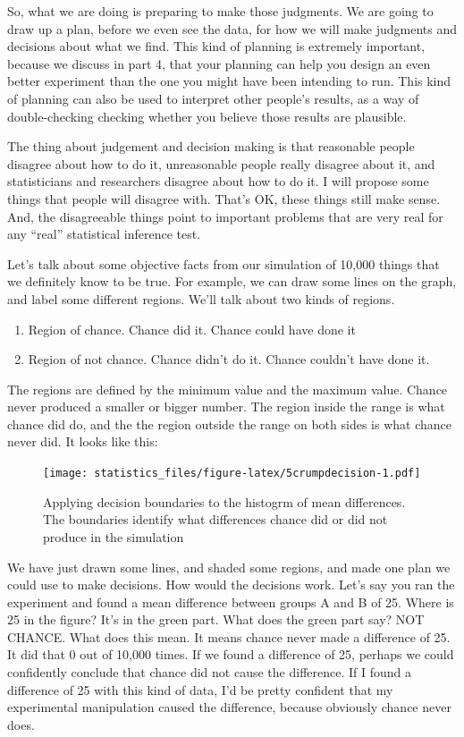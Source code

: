 \documentclass[]{book}
\providecommand{\tightlist}{%
  \setlength{\itemsep}{0pt}\setlength{\parskip}{0pt}}
\begin{document}
So, what we are doing is preparing to make those judgments. We are going to draw up a plan, before we even see the data, for how we will make judgments and decisions about what we find. This kind of planning is extremely important, because we discuss in part 4, that your planning can help you design an even better experiment than the one you might have been intending to run. This kind of planning can also be used to interpret other people's results, as a way of double-checking checking whether you believe those results are plausible.

The thing about judgement and decision making is that reasonable people disagree about how to do it, unreasonable people really disagree about it, and statisticians and researchers disagree about how to do it. I will propose some things that people will disagree with. That's OK, these things still make sense. And, the disagreeable things point to important problems that are very real for any ``real'' statistical inference test.

Let's talk about some objective facts from our simulation of 10,000 things that we definitely know to be true. For example, we can draw some lines on the graph, and label some different regions. We'll talk about two kinds of regions.

\begin{enumerate}
\def\labelenumi{\arabic{enumi}.}
\tightlist
\item
  Region of chance. Chance did it. Chance could have done it
\item
  Region of not chance. Chance didn't do it. Chance couldn't have done it.
\end{enumerate}

The regions are defined by the minimum value and the maximum value. Chance never produced a smaller or bigger number. The region inside the range is what chance did do, and the the region outside the range on both sides is what chance never did. It looks like this:

\begin{figure}
\centering
\texttt{[image: statistics\_files/figure-latex/5crumpdecision-1.pdf]}
\caption{\label{fig:5crumpdecision}Applying decision boundaries to the histogrm of mean differences. The boundaries identify what differences chance did or did not produce in the simulation}
\end{figure}

We have just drawn some lines, and shaded some regions, and made one plan we could use to make decisions. How would the decisions work. Let's say you ran the experiment and found a mean difference between groups A and B of 25. Where is 25 in the figure? It's in the green part. What does the green part say? NOT CHANCE. What does this mean. It means chance never made a difference of 25. It did that 0 out of 10,000 times. If we found a difference of 25, perhaps we could confidently conclude that chance did not cause the difference. If I found a difference of 25 with this kind of data, I'd be pretty confident that my experimental manipulation caused the difference, because obviously chance never does.
\end{document}
